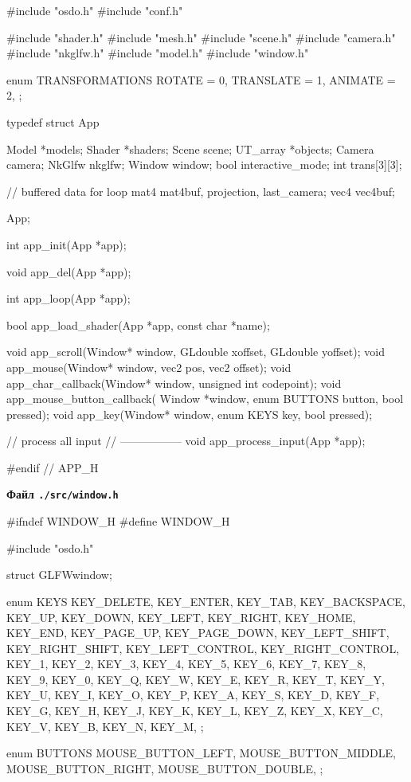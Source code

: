 \documentclass[14pt,a4paper]{extarticle}
\theoremstyle{definition}
\renewcommand{\[}{\begin{singlespace}\begin{equation*}}
\renewcommand{\]}{\end{equation*}\end{singlespace}}
\begin{document}
\begin{multicols}{2}
\begin{ccode}
#include "osdo.h"
#include "conf.h"

#include "shader.h"
#include "mesh.h"
#include "scene.h"
#include "camera.h"
#include "nkglfw.h"
#include "model.h"
#include "window.h"

enum TRANSFORMATIONS {
    ROTATE    = 0,
    TRANSLATE = 1,
    ANIMATE   = 2,
};

typedef struct App {
    Model *models;
    Shader *shaders;
    Scene scene;
    UT_array *objects;
    Camera camera;
    NkGlfw nkglfw;
    Window window;
    bool interactive_mode;
    int trans[3][3];

    // buffered data for loop
    mat4 mat4buf, projection, last_camera;
    vec4 vec4buf;
} App;

int app_init(App *app);

void app_del(App *app);

int app_loop(App *app);

bool app_load_shader(App *app, const char *name);

void app_scroll(Window* window, GLdouble xoffset, GLdouble yoffset);
void app_mouse(Window* window, vec2 pos, vec2 offset);
void app_char_callback(Window* window, unsigned int codepoint);
void app_mouse_button_callback(
        Window *window, enum BUTTONS button, bool pressed);
void app_key(Window* window, enum KEYS key, bool pressed);

// process all input
// -----------------
void app_process_input(App *app);

#endif // APP_H
\end{ccode}
\noindent\cprotect\textbf{Файл \verb+./src/window.h+}
\begin{ccode}
#ifndef WINDOW_H
#define WINDOW_H

#include "osdo.h"

struct GLFWwindow;

enum KEYS {
    KEY_DELETE,
    KEY_ENTER,
    KEY_TAB,
    KEY_BACKSPACE,
    KEY_UP,
    KEY_DOWN,
    KEY_LEFT,
    KEY_RIGHT,
    KEY_HOME,
    KEY_END,
    KEY_PAGE_UP,
    KEY_PAGE_DOWN,
    KEY_LEFT_SHIFT,
    KEY_RIGHT_SHIFT,
    KEY_LEFT_CONTROL,
    KEY_RIGHT_CONTROL,
    KEY_1, KEY_2, KEY_3, KEY_4, KEY_5, KEY_6, KEY_7, KEY_8, KEY_9, KEY_0,
    KEY_Q, KEY_W, KEY_E, KEY_R, KEY_T, KEY_Y, KEY_U, KEY_I, KEY_O, KEY_P,
    KEY_A, KEY_S, KEY_D, KEY_F, KEY_G, KEY_H, KEY_J, KEY_K, KEY_L,
    KEY_Z, KEY_X, KEY_C, KEY_V, KEY_B, KEY_N, KEY_M,
};

enum BUTTONS {
    MOUSE_BUTTON_LEFT,
    MOUSE_BUTTON_MIDDLE,
    MOUSE_BUTTON_RIGHT,
    MOUSE_BUTTON_DOUBLE,
};


\end{ccode}
\end{multicols}
\end{document}
